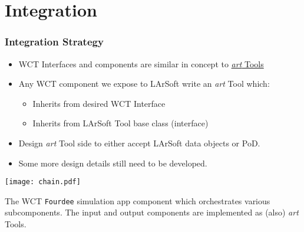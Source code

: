 \documentclass[xcolor=dvipsnames]{beamer}
\def\ls{LArSoft\xspace}
\def\art{\textit{art}\xspace}
\begin{document}
\section{Integration}

\begin{frame}
\end{frame}

\begin{frame}
  \frametitle{Integration Strategy}
  \footnotesize
  \begin{itemize}
  \item WCT Interfaces and components are similar in concept to
    \href{https://cdcvs.fnal.gov/redmine/projects/art/wiki/Guide_to_writing_and_using_tools}{\art Tools}
  \item Any WCT component we expose to \ls write an \art Tool which:
    \begin{itemize}\scriptsize
    \item Inherits from desired WCT Interface
    \item Inherits from \ls Tool base class (interface)
    \end{itemize}
  \item Design \art Tool side to either accept \ls data objects or PoD.
  \item Some more design details still need to be developed.
  \end{itemize}
  \begin{center}
    \texttt{[image: chain.pdf]}

    \scriptsize
    The WCT \texttt{Fourdee} simulation app component which
    orchestrates various subcomponents.  The input and output
    components are implemented as (also) \art Tools.
  \end{center}
\end{frame}
\end{document}
